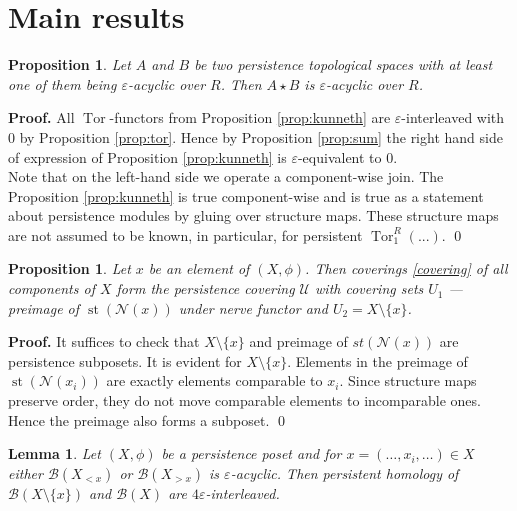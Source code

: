 \documentclass[english,12pt]{article}
\newcounter{stmcounter}[section]
\numberwithin{equation}{section}
\newtheorem{proposition}[stmcounter]{Proposition}
\newtheorem{lemma}[stmcounter]{Lemma}
\theoremstyle{definition}
\theoremstyle{remark}
\newenvironment{pf}{\noindent\textbf{Proof.}}{\qed}
\begin{document}
\section{Main results}

\begin{proposition}
  \label{prop:acyclic}
  Let $A$ and $B$ be two persistence topological spaces with at least one of them being $\varepsilon$-acyclic over $R$. Then $A \star B$ is $\varepsilon$-acyclic over $R$.
\end{proposition}

\begin{pf}
  All $\operatorname{Tor}$-functors from Proposition \ref{prop:kunneth} are $\varepsilon$-interleaved with $0$ by Proposition \ref{prop:tor}. Hence by Proposition \ref{prop:sum} the right hand side of expression of Proposition \ref{prop:kunneth} is $\varepsilon$-equivalent to $0$.\\
  
  Note that on the left-hand side we operate a component-wise join. The Proposition \ref{prop:kunneth} is true component-wise and is true as a statement about persistence modules by gluing over structure maps. These structure maps are not assumed to be known, in particular, for persistent $\operatorname{Tor}_1^R(...)$.
\end{pf}\\

\begin{proposition}
  Let $x$ be an element of $(X,\phi)$. Then coverings \eqref{covering} of all components of $X$ form the persistence covering $\mathcal{U}$ with covering sets $U_1$ --- preimage of $\operatorname{st}(\mathcal{N}(x))$ under nerve functor and $U_2 = X \setminus \{x\}$.
\end{proposition}

\begin{pf}
  It suffices to check that $X \setminus \{x\}$ and preimage of $st(\mathcal{N}(x))$ are persistence subposets.
  It is evident for $X \setminus \{x\}$. Elements in the preimage of $\operatorname{st}(\mathcal{N}(x_i))$ are exactly elements comparable to $x_i$. Since structure maps preserve order, they do not move comparable elements to incomparable ones. Hence the preimage also forms a subposet.
\end{pf}\\

\begin{lemma}
  Let $(X,\phi)$ be a persistence poset and for $x=(\ldots,x_i,\ldots) \in X$ either $\mathcal{B}(X_{< x})$ or $\mathcal{B}(X_{> x})$ is $\varepsilon$-acyclic. Then persistent homology of $\mathcal{B}(X \setminus \{x\})$ and $\mathcal{B}(X)$ are $4\varepsilon$-interleaved.
\end{lemma}
\end{document}
